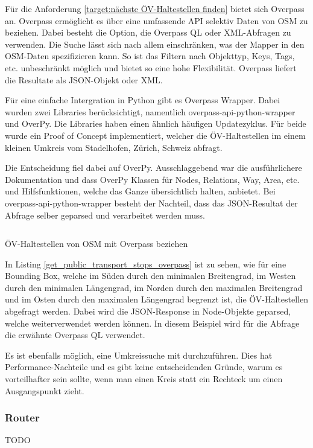 Für die Anforderung \ref{target:nächste ÖV-Haltestellen finden} bietet sich Overpass an. Overpass ermöglicht es über eine umfassende \ac{API} selektiv Daten von \ac{OSM} zu beziehen. Dabei besteht die Option, die Overpass \ac{QL} oder XML-Abfragen zu verwenden. Die Suche lässt sich nach allem einschränken, was der Mapper in den \ac{OSM}-Daten spezifizieren kann. So ist das Filtern nach Objekttyp, Keys, Tags, etc. unbeschränkt möglich und bietet so eine hohe Flexibilität. Overpass liefert die Resultate als JSON-Objekt oder XML. 

Für eine einfache Intergration in Python gibt es Overpass Wrapper. Dabei wurden zwei Libraries berücksichtigt, namentlich overpass-api-python-wrapper und OverPy. Die Libraries haben einen ähnlich häufigen Updatezyklus. Für beide wurde ein Proof of Concept implementiert, welcher die ÖV-Haltestellen im einem kleinen Umkreis vom Stadelhofen, Zürich, Schweiz abfragt.

Die Entscheidung fiel dabei auf OverPy. Ausschlaggebend war die ausführlichere Dokumentation und dass OverPy Klassen für Nodes, Relations, Way, Area, etc. und Hilfsfunktionen, welche das Ganze übersichtlich halten, anbietet. Bei overpass-api-python-wrapper besteht der Nachteil, dass das JSON-Resultat der Abfrage selber geparsed und verarbeitet werden muss.

\begin{listing}[ht]
    \inputminted{python}{projectdoc/listing/get_public_transport_stops_overpass.py}
    \caption{ÖV-Haltestellen von \acs{OSM} mit Overpass beziehen}
    \label{get_public_transport_stops_overpass}
\end{listing}

In Listing \ref{get_public_transport_stops_overpass} ist zu sehen, wie für eine Bounding Box, welche im Süden durch den minimalen Breitengrad, im Westen durch den minimalen Längengrad, im Norden durch den maximalen Breitengrad und im Osten durch den maximalen Längengrad begrenzt ist, die ÖV-Haltestellen abgefragt werden. Dabei wird die JSON-Response in Node-Objekte geparsed, welche weiterverwendet werden können. In diesem Beispiel wird für die Abfrage die erwähnte Overpass QL verwendet.

Es ist ebenfalls möglich, eine Umkreissuche mit   durchzuführen. Dies hat Performance-Nachteile und es gibt keine entscheidenden Gründe, warum es vorteilhafter sein sollte, wenn man einen Kreis statt ein Rechteck um einen Ausgangspunkt zieht.

\subsubsection{Router}
\label{architektur:Router}

TODO
